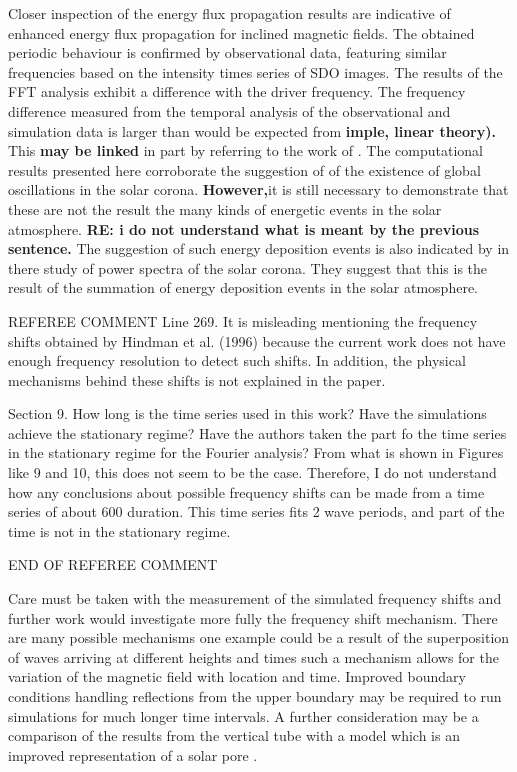 \documentclass[physics,article,submit,pdftex,moreauthors]{Definitions/mdpi}
\begin{document}
 Closer inspection of the energy flux propagation results are indicative of enhanced energy flux propagation for inclined magnetic fields. The obtained periodic behaviour is confirmed by observational data, featuring similar frequencies based on the intensity times series of SDO images. The results of the FFT analysis exhibit a difference with the driver frequency. The frequency difference measured from the temporal analysis of the observational and simulation data is larger than would be expected from {\bf imple, linear theory). }
 This {\bf may be linked}
  in part by referring to the work of \citet{Campbell1989}. The computational results presented here corroborate the suggestion of \citet{Didkovsky2013} of the existence of global oscillations in the solar corona. {\bf However,}it is still necessary to demonstrate that these are not the result the many kinds of energetic events in the solar atmosphere. {\bf RE: i do not understand what is meant by the previous sentence.}
The suggestion of such energy deposition events is also indicated by \citet{Ireland2015} in there study of power spectra of the solar corona. They suggest that this is the result of the summation of energy deposition events in the solar atmosphere. 




REFEREE COMMENT
 Line 269. It is misleading mentioning the frequency shifts obtained by Hindman et al. (1996) because the current work does not have enough frequency resolution to detect such shifts. In addition, the physical mechanisms behind these shifts is not explained in the paper.
 
 Section 9. How long is the time series used in this work? Have the simulations achieve the stationary regime?
Have the authors taken the part fo the time series in the stationary regime for the Fourier analysis? From what is shown in Figures like 9 and 10, this does not seem to be the case. Therefore, I do not understand how any conclusions about possible frequency shifts can be made from a time series of about 600 duration. This time series fits 2 wave periods, and part of the time is not in the stationary regime.
 
END OF REFEREE COMMENT

Care must be taken with the measurement of the simulated frequency shifts and further work would investigate more fully the frequency shift mechanism. There are many possible mechanisms one example could be a result of the superposition of waves arriving at different heights and times such a mechanism allows for the variation of the   magnetic field with location and time. Improved boundary conditions handling reflections from the upper boundary  may be required to run simulations for much longer time intervals. A further consideration may be a comparison of the results from the vertical tube with a model which is an improved representation of a solar pore \citet{Simon1970} \citet{Cameron2007}.
\end{document}
